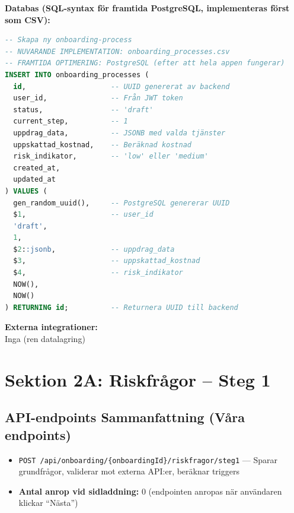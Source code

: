 \documentclass[12pt,a4paper]{article}
\begin{document}
\textbf{Databas (SQL-syntax för framtida PostgreSQL, implementeras först som CSV):}
\begin{lstlisting}[language=sql]
-- Skapa ny onboarding-process
-- NUVARANDE IMPLEMENTATION: onboarding_processes.csv
-- FRAMTIDA OPTIMERING: PostgreSQL (efter att hela appen fungerar)
INSERT INTO onboarding_processes (
  id,                    -- UUID genererat av backend
  user_id,               -- Från JWT token
  status,                -- 'draft'
  current_step,          -- 1
  uppdrag_data,          -- JSONB med valda tjänster
  uppskattad_kostnad,    -- Beräknad kostnad
  risk_indikator,        -- 'low' eller 'medium'
  created_at,
  updated_at
) VALUES (
  gen_random_uuid(),     -- PostgreSQL genererar UUID
  $1,                    -- user_id
  'draft',
  1,
  $2::jsonb,             -- uppdrag_data
  $3,                    -- uppskattad_kostnad
  $4,                    -- risk_indikator
  NOW(),
  NOW()
) RETURNING id;          -- Returnera UUID till backend
\end{lstlisting}

\textbf{Externa integrationer:}\\
Inga (ren datalagring)

\newpage
\section{Sektion 2A: Riskfrågor – Steg 1}

\subsection{API-endpoints Sammanfattning (Våra endpoints)}

\begin{itemize}[noitemsep]
  \item \texttt{POST /api/onboarding/\{onboardingId\}/riskfragor/steg1} — Sparar grundfrågor, validerar mot externa API:er, beräknar triggers
  \item \textbf{Antal anrop vid sidladdning:} 0 (endpointen anropas när användaren klickar \enquote{Nästa})
\end{itemize}

\end{document}
